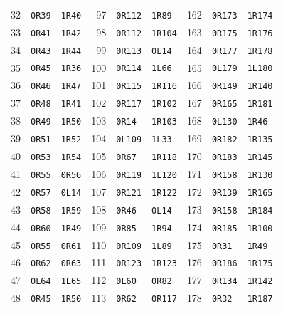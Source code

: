 {\begin{longtable}{@{}rll@{\hspace{1.8em}}rll@{\hspace{1.8em}}rll@{}}
32 & \texttt{0R39} & \texttt{1R40} & 97 & \texttt{0R112} & \texttt{1R89} & 162 & \texttt{0R173} & \texttt{1R174}\\
33 & \texttt{0R41} & \texttt{1R42} & 98 & \texttt{0R112} & \texttt{1R104} & 163 & \texttt{0R175} & \texttt{1R176}\\
34 & \texttt{0R43} & \texttt{1R44} & 99 & \texttt{0R113} & \texttt{0L14} & 164 & \texttt{0R177} & \texttt{1R178}\\
35 & \texttt{0R45} & \texttt{1R36} & 100 & \texttt{0R114} & \texttt{1L66} & 165 & \texttt{0L179} & \texttt{1L180}\\
36 & \texttt{0R46} & \texttt{1R47} & 101 & \texttt{0R115} & \texttt{1R116} & 166 & \texttt{0R149} & \texttt{1R140}\\
37 & \texttt{0R48} & \texttt{1R41} & 102 & \texttt{0R117} & \texttt{1R102} & 167 & \texttt{0R165} & \texttt{1R181}\\
38 & \texttt{0R49} & \texttt{1R50} & 103 & \texttt{0R14} & \texttt{1R103} & 168 & \texttt{0L130} & \texttt{1R46}\\
39 & \texttt{0R51} & \texttt{1R52} & 104 & \texttt{0L109} & \texttt{1L33} & 169 & \texttt{0R182} & \texttt{1R135}\\
40 & \texttt{0R53} & \texttt{1R54} & 105 & \texttt{0R67} & \texttt{1R118} & 170 & \texttt{0R183} & \texttt{1R145}\\
41 & \texttt{0R55} & \texttt{0R56} & 106 & \texttt{0R119} & \texttt{1L120} & 171 & \texttt{0R158} & \texttt{1R130}\\
42 & \texttt{0R57} & \texttt{0L14} & 107 & \texttt{0R121} & \texttt{1R122} & 172 & \texttt{0R139} & \texttt{1R165}\\
43 & \texttt{0R58} & \texttt{1R59} & 108 & \texttt{0R46} & \texttt{0L14} & 173 & \texttt{0R158} & \texttt{1R184}\\
44 & \texttt{0R60} & \texttt{1R49} & 109 & \texttt{0R85} & \texttt{1R94} & 174 & \texttt{0R185} & \texttt{1R100}\\
45 & \texttt{0R55} & \texttt{0R61} & 110 & \texttt{0R109} & \texttt{1L89} & 175 & \texttt{0R31} & \texttt{1R49}\\
46 & \texttt{0R62} & \texttt{0R63} & 111 & \texttt{0R123} & \texttt{1R123} & 176 & \texttt{0R186} & \texttt{1R175}\\
47 & \texttt{0L64} & \texttt{1L65} & 112 & \texttt{0L60} & \texttt{0R82} & 177 & \texttt{0R134} & \texttt{1R142}\\
48 & \texttt{0R45} & \texttt{1R50} & 113 & \texttt{0R62} & \texttt{0R117} & 178 & \texttt{0R32} & \texttt{1R187}\\

\end{longtable}}

